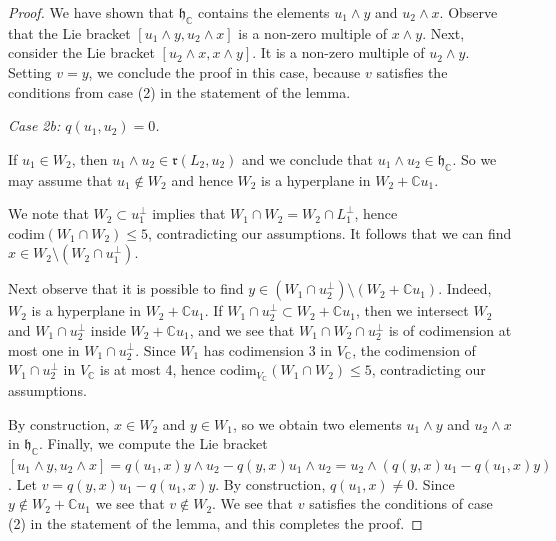 \documentclass[10pt,a4paper]{amsart}
\newcommand{\bbC}{\mathbb{C}}
\newcommand{\frh}{\mathfrak{h}}
\newcommand{\frr}{\mathfrak{r}}
\renewcommand{\le}{\leqslant}
\newcommand{\wdg}{\wedge}
\begin{document}
\begin{proof}
We have shown that $\frh_\bbC$ contains the elements $u_1\wdg y$ and $u_2\wdg x$.
Observe that the Lie bracket $[u_1\wdg y, u_2\wdg x]$ is a non-zero multiple of $x\wdg y$.
Next, consider the Lie bracket $[u_2\wdg x,x\wdg y]$. It is a non-zero multiple
of $u_2\wdg y$. Setting $v = y$, we conclude the proof in this case, because
$v$ satisfies the conditions from case (2) in the statement of the lemma.

\medskip
{\it Case 2b: $q(u_1,u_2) = 0$.}

If $u_1\in W_2$, then $u_1\wdg u_2 \in \frr(L_2, u_2)$ and we conclude that $u_1\wdg u_2\in \frh_\bbC$.
So we may assume that $u_1\notin W_2$ and hence $W_2$ is a hyperplane in $W_2+ \bbC u_1$.

We note that $W_2\subset u_1^\perp$ implies that $W_1\cap W_2 = W_2\cap L_1^\perp$, hence
$\mathrm{codim}(W_1\cap W_2)\le 5$, contradicting our assumptions. It follows that
we can find $x\in W_2\setminus (W_2\cap u_1^\perp)$.

Next observe that it is possible to find $y\in (W_1\cap u_2^\perp)\setminus (W_2+ \bbC u_1)$.
Indeed, $W_2$ is a hyperplane in $W_2+ \bbC u_1$. If $W_1\cap u_2^\perp\subset W_2+ \bbC u_1$,
then we intersect $W_2$ and $W_1\cap u_2^\perp$ inside $W_2+ \bbC u_1$, and we see that $W_1 \cap W_2\cap u_2^\perp$ is of
codimension at most one in $W_1\cap u_2^\perp$. Since $W_1$ has codimension 3 in $V_\bbC$,
the codimension of $W_1\cap u_2^\perp$ in $V_\bbC$ is at most 4, hence $\mathrm{codim}_{V_\bbC}(W_1\cap W_2)\le 5$,
contradicting our assumptions.

By construction, $x\in W_2$ and $y\in W_1$, so we obtain two elements $u_1\wdg y$ and $u_2\wdg x$ in $\frh_\bbC$.
Finally, we compute the Lie bracket $[u_1\wdg y, u_2\wdg x] = q(u_1,x)y\wdg u_2 -q(y,x)u_1\wdg u_2
= u_2\wdg(q(y,x)u_1 - q(u_1,x)y)$. Let $v = q(y,x)u_1 - q(u_1,x)y$.
By construction, $q(u_1,x)\neq 0$. Since $y\notin W_2+ \bbC u_1$ we see that $v\notin W_2$.
We see that $v$ satisfies the conditions of case (2) in the statement of
the lemma, and this completes the proof.
\end{proof}
\end{document}
